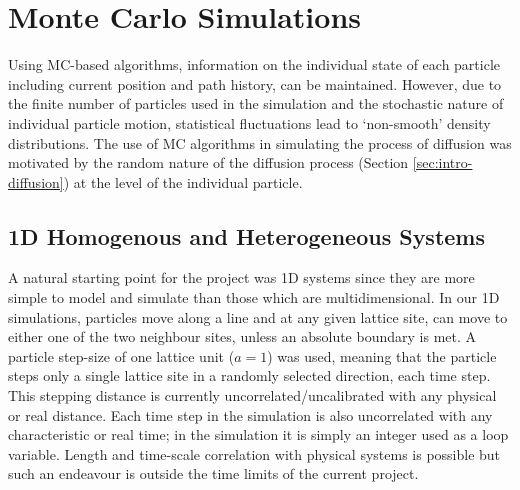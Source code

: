 
\section{Monte Carlo Simulations}

	Using MC-based algorithms, information on the individual state of each particle including current position and path history, can be maintained. However, due to the finite number of particles used in the simulation and the stochastic nature of individual particle motion, statistical fluctuations lead to `non-smooth' density distributions. The use of MC algorithms in simulating the process of diffusion was motivated by the random nature of the diffusion process (Section \ref{sec:intro-diffusion}) at the level of the individual particle.

\subsection{1D Homogenous and Heterogeneous Systems}
	A natural starting point for the project was 1D systems since they are more simple to model and simulate than those which are multidimensional. In our 1D simulations, particles move along a line and at any given lattice site, can move to either one of the two neighbour sites, unless an absolute boundary is met. A particle step-size of one lattice unit ($ a = 1 $) was used, meaning that the particle steps only a single lattice site in a randomly selected direction, each time step. This stepping distance is currently uncorrelated/uncalibrated with any physical or real distance. Each time step in the simulation is also uncorrelated with any characteristic or real time; in the simulation it is simply an integer used as a loop variable. Length and time-scale correlation with physical systems is possible but such an endeavour is outside the time limits of the current project.
	
